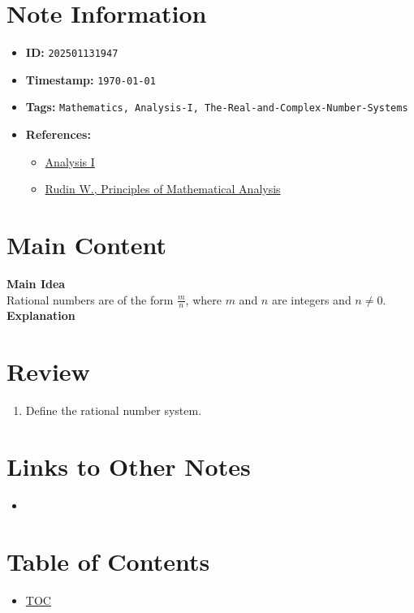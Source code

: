 \clearpage
{}
\label{202501131947}
\renewcommand{\notetitle}{Definition of Rational Numbers}

\section*{Note Information}
\begin{itemize}
  \item \textbf{ID:} \texttt{202501131947}
  \item \textbf{Timestamp:} \texttt{\today \ \currenttime}
  \item \textbf{Tags:} \texttt{Mathematics, Analysis-I, The-Real-and-Complex-Number-Systems}
  \item \textbf{References:}
    \begin{itemize}
      \item \href{https://ocw.mit.edu/courses/18-100b-analysis-i-fall-2010/}{Analysis I}
      \item \href{/home/garrett/Personal/References/Mathematics/Analysis-I/Rudin.pdf}{Rudin W., Principles of Mathematical Analysis}
    \end{itemize}
\end{itemize}


\section*{Main Content}
\textbf{Main Idea}\\
Rational numbers are of the form $\frac{m}{n}$, where $m$ and $n$ are integers and $n \neq 0$.\\

\textbf{Explanation}\\


\section*{Review}
\begin{enumerate}
  \item Define the rational number system.
\end{enumerate}


\section*{Links to Other Notes}
\begin{itemize}
  \item \hyperref[]{}
\end{itemize}

\section*{Table of Contents}

\begin{itemize}
  \item \hyperref[toc]{TOC}
\end{itemize}

